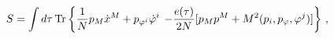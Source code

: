 \begin{equation}\label{1}
S=\int d\tau\, {\rm Tr}\left\{{1\over N}p_M\dot
x^M+p_{\varphi^i}\dot\varphi^i\right. \left. -{{e(\tau)}\over
2N}[p_Mp^M+M^2(p_i,p_\varphi,\varphi^j)]\right\}\,,
\end{equation}

